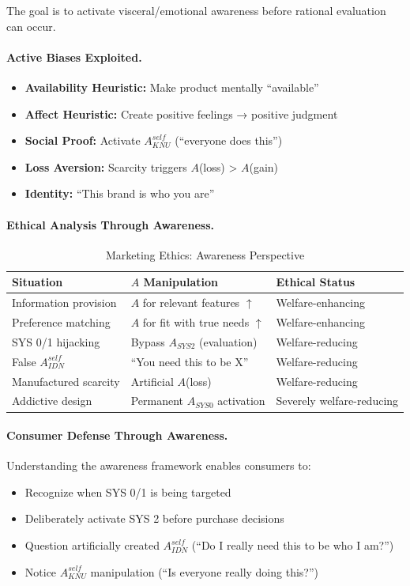 The goal is to activate visceral/emotional awareness before rational 
evaluation can occur.

\paragraph{Active Biases Exploited.}
\begin{itemize}
\item \textbf{Availability Heuristic:} Make product mentally ``available''
\item \textbf{Affect Heuristic:} Create positive feelings → positive judgment
\item \textbf{Social Proof:} Activate $A^{self}_{KNU}$ (``everyone does this'')
\item \textbf{Loss Aversion:} Scarcity triggers $A$(loss) > $A$(gain)
\item \textbf{Identity:} ``This brand is who you are''
\end{itemize}

\paragraph{Ethical Analysis Through Awareness.}

\begin{table}[htbp]
\centering
\caption{Marketing Ethics: Awareness Perspective}
\label{tab:marketing-ethics}
\renewcommand{\arraystretch}{1.3}
\begin{tabular}{@{}lll@{}}
\toprule
\textbf{Situation} & \textbf{$A$ Manipulation} & \textbf{Ethical Status} \\
\midrule
Information provision & $A$ for relevant features $\uparrow$ & Welfare-enhancing \\
Preference matching & $A$ for fit with true needs $\uparrow$ & Welfare-enhancing \\
SYS 0/1 hijacking & Bypass $A_{SYS2}$ (evaluation) & Welfare-reducing \\
False $A^{self}_{IDN}$ & ``You need this to be X'' & Welfare-reducing \\
Manufactured scarcity & Artificial $A$(loss) & Welfare-reducing \\
Addictive design & Permanent $A_{SYS0}$ activation & Severely welfare-reducing \\
\bottomrule
\end{tabular}
\end{table}

\paragraph{Consumer Defense Through Awareness.}
Understanding the awareness framework enables consumers to:
\begin{itemize}
\item Recognize when SYS 0/1 is being targeted
\item Deliberately activate SYS 2 before purchase decisions
\item Question artificially created $A^{self}_{IDN}$ (``Do I really need this 
to be who I am?'')
\item Notice $A^{self}_{KNU}$ manipulation (``Is everyone really doing this?'')
\end{itemize}

